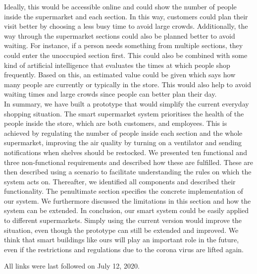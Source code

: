 \documentclass[runningheads]{llncs}
\begin{document}
	Ideally, this would be accessible online and could show the number of people inside the supermarket and each section. 
	In this way, customers could plan their visit better by choosing a less busy time to avoid large crowds. 
	Additionally, the way through the supermarket sections could also be planned better to avoid waiting. 
	For instance, if a person needs something from multiple sections, they could enter the unoccupied section first.
	This could also be combined with some kind of artificial intelligence that evaluates the times at which people shop frequently. 
	Based on this, an estimated value could be given which says how many people are currently or typically in the store. 
	This would also help to avoid waiting times and large crowds since people can better plan their day.
	\\ \linebreak
	In summary, we have built a prototype that would simplify the current everyday shopping situation.
	The smart supermarket system prioritises the health of the people inside the store, which are both customers, and employees. 
	This is achieved by regulating the number of people inside each section and the whole supermarket, improving the air quality by turning on a ventilator and sending notifications when shelves should be restocked.
	We presented ten functional and three non-functional requirements and described how these are fulfilled.
	These are then described using a scenario to facilitate understanding the rules on which the system acts on.
	Thereafter, we identified all components and described their functionality.
	The penultimate section specifies the concrete implementation of our system. 
	We furthermore discussed the limitations in this section and how the system can be extended. 
	In conclusion, our smart system could be easily applied to different supermarkets. 
	Simply using the current version would improve the situation, even though the prototype can still be extended and improved. 
	We think that smart buildings like ours will play an important role in the future, even if the restrictions and regulations due to the corona virus are lifted again. 
	
	
	
	
	
	All links were last followed on July 12, 2020.
	
\end{document}
